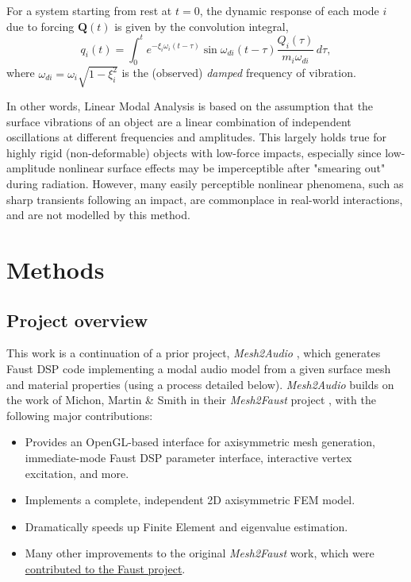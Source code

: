 \documentclass[12pt]{article}
\newcommand{\vct}[1]{\mathbf{#1}}
\begin{document}
For a system starting from rest at $t=0$, the dynamic response of each mode $i$ due to forcing $\vct{Q}(t)$ is given by the convolution integral,
$$q_i(t) = \int_{0}^{t} e^{-\xi_i \omega_i (t-\tau)} \sin \omega_{di} (t- \tau) \frac{Q_i(\tau)}{m_i \omega_{di}} \, d\tau,$$
where $\omega_{di} = \omega_i \sqrt{1 - \xi_i^2}$ is the (observed) \textit{damped} frequency of vibration.

In other words, Linear Modal Analysis is based on the assumption that the surface vibrations of an object are a linear combination of independent oscillations at different frequencies and amplitudes.
This largely holds true for highly rigid (non-deformable) objects with low-force impacts, especially since low-amplitude nonlinear surface effects may be imperceptible after "smearing out" during radiation.
However, many easily perceptible nonlinear phenomena, such as sharp transients following an impact, are commonplace in real-world interactions, and are not modelled by this method.

\section{Methods}

\subsection{Project overview}

This work is a continuation of a prior project, \textit{Mesh2Audio} \cite{mesh2audio}, which generates Faust DSP code implementing a modal audio model from a given surface mesh and material properties (using a process detailed below).
\textit{Mesh2Audio} builds on the work of Michon, Martin \& Smith in their \textit{Mesh2Faust} project \cite{michon_mesh2faust}, with the following major contributions:
\begin{itemize}
  \item Provides an OpenGL-based interface for axisymmetric mesh generation, immediate-mode Faust DSP parameter interface, interactive vertex excitation, and more.
  \item Implements a complete, independent 2D axisymmetric FEM model.
  \item Dramatically speeds up Finite Element and eigenvalue estimation.
  \item Many other improvements to the original \textit{Mesh2Faust} work, which were \href{https://github.com/grame-cncm/faust/pull/870}{contributed to the Faust project}.
\end{itemize}
\end{document}
